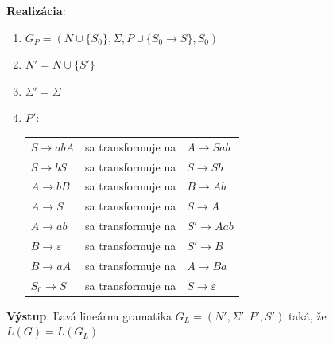 \documentclass[11pt,a4paper]{article}
\begin{document}
\textbf{Realizácia}:\\[-2em]
\begin{center}
\begin{minipage}{0.9\textwidth}
\begin{enumerate}[1.)]
    \item $G_P = (N \cup \{S_0\},\Sigma,P \cup \{S_0 \rightarrow S\},S_0)$\\[-2em]
    \item $N' = N \cup \{S'\}$\\[-2em]
    \item $\Sigma' = \Sigma$\\[-2em]
    \item $P'$:\\[-3.45em]%
    \begin{center}
    \begin{minipage}{0.85\textwidth}
        \begin{tabular}{lcl}
            $S   \rightarrow abA$         & sa transformuje na & $A  \rightarrow Sab$\\
            $S   \rightarrow bS $         & sa transformuje na & $S  \rightarrow Sb $\\
            $A   \rightarrow bB $         & sa transformuje na & $B  \rightarrow Ab $\\
            $A   \rightarrow S  $         & sa transformuje na & $S  \rightarrow A  $\\
            $A   \rightarrow ab $         & sa transformuje na & $S' \rightarrow Aab$\\
            $B   \rightarrow \varepsilon$ & sa transformuje na & $S' \rightarrow B  $\\
            $B   \rightarrow aA $         & sa transformuje na & $A  \rightarrow Ba $\\
            $S_0 \rightarrow S  $         & sa transformuje na & $S  \rightarrow \varepsilon$\\
        \end{tabular}
    \end{minipage}
    \end{center}
\end{enumerate}
\end{minipage}
\end{center}
\textbf{Výstup}: Ľavá lineárna gramatika $G_L = (N',\Sigma',P',S')$ taká, že $L(G)=L(G_L)$\\
\end{document}
